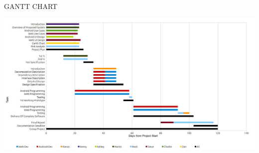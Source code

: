 \documentclass{article}
\begin{document}
	\newpage
	\begin{section}{GANTT CHART}
		\begin{center}
		\includegraphics[height=0.69\columnwidth, angle=90]{../Diagrams/GanttChart/GanttChart.jpg}
		\end{center}
	\end{section}
	
\end{document}
